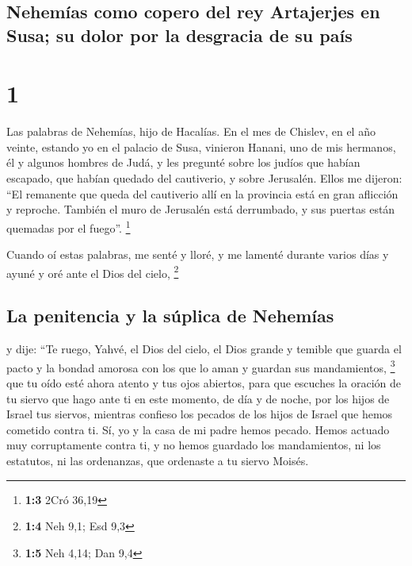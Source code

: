 \hypertarget{nehemuxedas-como-copero-del-rey-artajerjes-en-susa-su-dolor-por-la-desgracia-de-su-pauxeds}{%
\subsection{Nehemías como copero del rey Artajerjes en Susa; su dolor
por la desgracia de su
país}\label{nehemuxedas-como-copero-del-rey-artajerjes-en-susa-su-dolor-por-la-desgracia-de-su-pauxeds}}

\hypertarget{section}{%
\section{1}\label{section}}

 Las palabras de Nehemías, hijo de Hacalías. En el mes de
Chislev, en el año veinte, estando yo en el palacio de Susa,
 vinieron Hanani, uno de mis hermanos, él y algunos
hombres de Judá, y les pregunté sobre los judíos que habían escapado,
que habían quedado del cautiverio, y sobre Jerusalén. 
Ellos me dijeron: ``El remanente que queda del cautiverio allí en la
provincia está en gran aflicción y reproche. También el muro de
Jerusalén está derrumbado, y sus puertas están quemadas por el fuego''.
\footnote{\textbf{1:3} 2Cró 36,19}

 Cuando oí estas palabras, me senté y lloré, y me lamenté
durante varios días y ayuné y oré ante el Dios del cielo, \footnote{\textbf{1:4}
  Neh 9,1; Esd 9,3}

\hypertarget{la-penitencia-y-la-suxfaplica-de-nehemuxedas}{%
\subsection{La penitencia y la súplica de
Nehemías}\label{la-penitencia-y-la-suxfaplica-de-nehemuxedas}}

 y dije: ``Te ruego, Yahvé, el Dios del cielo, el Dios
grande y temible que guarda el pacto y la bondad amorosa con los que lo
aman y guardan sus mandamientos, \footnote{\textbf{1:5} Neh 4,14; Dan
  9,4}  que tu oído esté ahora atento y tus ojos abiertos,
para que escuches la oración de tu siervo que hago ante ti en este
momento, de día y de noche, por los hijos de Israel tus siervos,
mientras confieso los pecados de los hijos de Israel que hemos cometido
contra ti. Sí, yo y la casa de mi padre hemos pecado. 
Hemos actuado muy corruptamente contra ti, y no hemos guardado los
mandamientos, ni los estatutos, ni las ordenanzas, que ordenaste a tu
siervo Moisés.

